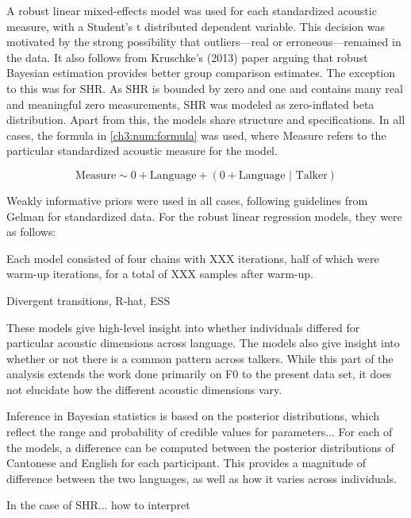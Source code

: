     A robust linear mixed-effects model was used for each standardized acoustic measure, with a Student's t distributed dependent variable. This decision was motivated by the strong possibility that outliers---real or erroneous---remained in the data. It also follows from Kruschke's (2013) paper arguing that robust Bayesian estimation provides better group comparison estimates. The exception to this was for SHR. As SHR is bounded by zero and one and contains many real and meaningful zero measurements, SHR was modeled as zero-inflated beta distribution. Apart from this, the models share structure and specifications. In all cases, the formula in \ref{ch3:num:formula} was used, where Measure refers to the particular standardized acoustic measure for the model. 
    
    \begin{equation}\label{ch3:num:formula}
        \text{Measure} \sim 0 + \text{Language} + (0 + \text{Language }|\text{ Talker})
    \end{equation}
    
    Weakly informative priors were used in all cases, following guidelines from Gelman for standardized data. For the robust linear regression models, they were as follows:
    
    Each model consisted of four chains with XXX iterations, half of which were warm-up iterations, for a total of XXX samples after warm-up.
    
    Divergent transitions, R-hat, ESS 
    
    These models give high-level insight into whether individuals differed for particular acoustic dimensions across language. The models also give insight into whether or not there is a common pattern across talkers. While this part of the analysis extends the work done primarily on F0 \citep[e.g., by][]{} to the present data set, it does not elucidate how the different acoustic dimensions vary. 
    
    Inference in Bayesian statistics is based on the posterior distributions, which reflect the range and probability of credible values for parameters... For each of the models, a difference can be computed between the posterior distributions of Cantonese and English for each participant. This provides a magnitude of difference between the two languages, as well as how it varies across individuals.  
    
    In the case of SHR... how to interpret
    
    
    
